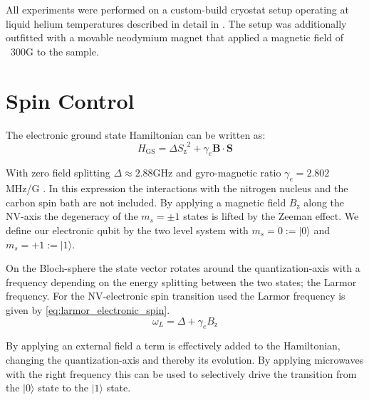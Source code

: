 All experiments were performed on a custom-build cryostat setup operating at liquid helium temperatures described in detail in \citet[chap.~3]{Bernien2014Control}. The setup was additionally outfitted with a movable neodymium magnet that applied a magnetic field of ~300G to the sample.

\section{Spin Control}
\label{spincontrol}

The electronic ground state Hamiltonian can be written as\citep{Pfaff2013Quantum}: 
 \begin{equation}
H_\mathrm{GS} = \Delta {S_\mathrm{z}}^2 + \gamma_e \mathbf{B} \cdot \mathbf{S}
\end{equation}

With zero field splitting $\Delta \approx 2.88 \mathrm{GHz}$  and gyro-magnetic ratio $\gamma_e  = 2.802$ MHz/G . In this expression the interactions with the nitrogen nucleus and the carbon spin bath are not included. By applying a magnetic field $B_\mathrm{z}$ along the NV-axis the degeneracy of the  $m_s =\pm1$ states is lifted by the Zeeman effect. We define our electronic qubit  by the two level system with  $m_s=0:=|0\rangle$ and $m_s = +1 := |1\rangle$.

On the Bloch-sphere the state vector rotates around the quantization-axis with a frequency depending on the energy splitting between the two states; the Larmor frequency.
For the NV-electronic spin transition used the Larmor frequency is given by \cref{eq:larmor_electronic_spin}.
\begin{equation}
    \omega_L =\Delta + \gamma_e {B_\mathrm{z}}
    \label{eq:larmor_electronic_spin}
\end{equation}

By applying an external field a term is effectively added to the Hamiltonian, changing the quantization-axis and thereby its evolution. By applying microwaves with the right frequency this can be used to selectively drive the transition from the  $|0\rangle$ state to the $|1\rangle$ state\citep{Jelezko2004Observation}.

